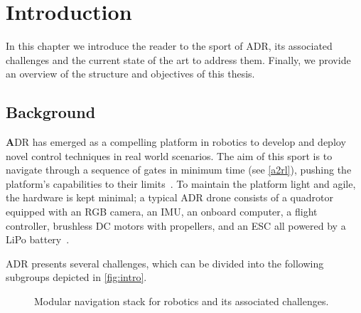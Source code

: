 
\chapter{Introduction\label{chap:introduction}}

In this chapter we introduce the reader to the sport of \ac{ADR}, its associated challenges and the current state of the art to address them. 
Finally, we provide an overview of the structure and objectives of this thesis.
\section{Background}

\lettrine[lines=2,lhang=0.2]{\textbf{\Huge A}}{DR} has emerged as a compelling platform in robotics to develop and deploy novel control techniques in real world scenarios.
The aim of this sport is to navigate through a sequence of gates in minimum time (see \autoref{a2rl}), pushing the platform’s capabilities to their limits~\cite{hanover_autonomous_2024}.
To maintain the platform light and agile, the hardware is kept minimal; a typical \ac{ADR} drone consists of a quadrotor equipped with an RGB camera, an \ac{IMU}, an onboard computer, a flight controller, brushless \ac{DC} motors with propellers, and an \ac{ESC} all powered by a \ac{LiPo} battery~\cite{hert_mrs_2023,foehn_agilicious_2022}.

\ac{ADR} presents several challenges, which can be divided into the following subgroups depicted in \autoref{fig:intro}.

\begin{figure}[H]
    \centering
    \resizebox{1.0\textwidth}{!}{}
    \caption{Modular navigation stack for robotics and its associated challenges.}
    \label{fig:intro}
\end{figure}

